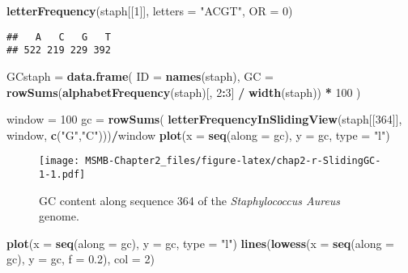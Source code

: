 \documentclass[]{article}
\newenvironment{Shaded}{\begin{snugshade}}{\end{snugshade}}
\newcommand{\KeywordTok}[1]{\textcolor[rgb]{0.13,0.29,0.53}{\textbf{#1}}}
\newcommand{\DataTypeTok}[1]{\textcolor[rgb]{0.13,0.29,0.53}{#1}}
\newcommand{\DecValTok}[1]{\textcolor[rgb]{0.00,0.00,0.81}{#1}}
\newcommand{\FloatTok}[1]{\textcolor[rgb]{0.00,0.00,0.81}{#1}}
\newcommand{\StringTok}[1]{\textcolor[rgb]{0.31,0.60,0.02}{#1}}
\newcommand{\OperatorTok}[1]{\textcolor[rgb]{0.81,0.36,0.00}{\textbf{#1}}}
\newcommand{\NormalTok}[1]{#1}
\begin{document}
\begin{Shaded}
\begin{Highlighting}[]
\KeywordTok{letterFrequency}\NormalTok{(staph[[}\DecValTok{1}\NormalTok{]], }\DataTypeTok{letters =} \StringTok{"ACGT"}\NormalTok{, }\DataTypeTok{OR =} \DecValTok{0}\NormalTok{)}
\end{Highlighting}
\end{Shaded}

\begin{verbatim}
##   A   C   G   T 
## 522 219 229 392
\end{verbatim}

\begin{Shaded}
\begin{Highlighting}[]
\NormalTok{GCstaph =}\StringTok{ }\KeywordTok{data.frame}\NormalTok{(}
  \DataTypeTok{ID =} \KeywordTok{names}\NormalTok{(staph),}
  \DataTypeTok{GC =} \KeywordTok{rowSums}\NormalTok{(}\KeywordTok{alphabetFrequency}\NormalTok{(staph)[, }\DecValTok{2}\OperatorTok{:}\DecValTok{3}\NormalTok{] }\OperatorTok{/}\StringTok{ }\KeywordTok{width}\NormalTok{(staph)) }\OperatorTok{*}\StringTok{ }\DecValTok{100}
\NormalTok{)}
\end{Highlighting}
\end{Shaded}

\begin{Shaded}
\begin{Highlighting}[]
\NormalTok{window =}\StringTok{ }\DecValTok{100}
\NormalTok{gc =}\StringTok{ }\KeywordTok{rowSums}\NormalTok{( }\KeywordTok{letterFrequencyInSlidingView}\NormalTok{(staph[[}\DecValTok{364}\NormalTok{]], window,}
                                           \KeywordTok{c}\NormalTok{(}\StringTok{"G"}\NormalTok{,}\StringTok{"C"}\NormalTok{)))}\OperatorTok{/}\NormalTok{window}
\KeywordTok{plot}\NormalTok{(}\DataTypeTok{x =} \KeywordTok{seq}\NormalTok{(}\DataTypeTok{along =}\NormalTok{ gc), }\DataTypeTok{y =}\NormalTok{ gc, }\DataTypeTok{type =} \StringTok{"l"}\NormalTok{)}
\end{Highlighting}
\end{Shaded}

\begin{figure}
\centering
\texttt{[image: MSMB-Chapter2\_files/figure-latex/chap2-r-SlidingGC-1-1.pdf]}
\caption{GC content along sequence 364 of the \emph{Staphylococcus
Aureus} genome.}
\end{figure}

\begin{Shaded}
\begin{Highlighting}[]
\KeywordTok{plot}\NormalTok{(}\DataTypeTok{x =} \KeywordTok{seq}\NormalTok{(}\DataTypeTok{along =}\NormalTok{ gc), }\DataTypeTok{y =}\NormalTok{ gc, }\DataTypeTok{type =} \StringTok{"l"}\NormalTok{)}
\KeywordTok{lines}\NormalTok{(}\KeywordTok{lowess}\NormalTok{(}\DataTypeTok{x =} \KeywordTok{seq}\NormalTok{(}\DataTypeTok{along =}\NormalTok{ gc), }\DataTypeTok{y =}\NormalTok{ gc, }\DataTypeTok{f =} \FloatTok{0.2}\NormalTok{), }\DataTypeTok{col =} \DecValTok{2}\NormalTok{)}
\end{Highlighting}
\end{Shaded}
\end{document}

